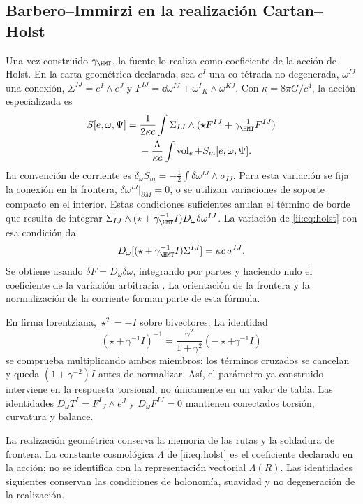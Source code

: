 \subsection{Barbero--Immirzi en la realización Cartan--Holst}
Una vez construido $\gamma_{\HMT}$, la fuente lo realiza como
coeficiente de la acción de Holst. En la carta geométrica declarada,
sea $e^I$ una co-tétrada no degenerada, $\omega^{IJ}$ una conexión,
$\Sigma^{IJ}=e^I\wedge e^J$ y
$F^{IJ}=\dd\omega^{IJ}+\omega^I{}_K\wedge\omega^{KJ}$.
Con $\kappa=8\pi G/c^4$, la acción especializada es
\begin{equation}
\begin{aligned}
S[e,\omega,\Psi]
={}&\frac1{2\kappa c}\int
\Sigma_{IJ}\wedge(\star F^{IJ}+\gamma_{\HMT}^{-1}F^{IJ})\\
&-\frac{\Lambda}{\kappa c}\int\operatorname{vol}_e
+S_m[e,\omega,\Psi].
\end{aligned}
\label{ii:eq:holst}
\end{equation}
La convención de corriente es
$\delta_\omega S_m=-\tfrac12\int\delta\omega^{IJ}\wedge\sigma_{IJ}$.
Para esta variación se fija la conexión en la frontera,
$\delta\omega^{IJ}|_{\partial M}=0$, o se utilizan variaciones de
soporte compacto en el interior. Estas condiciones suficientes anulan
el término de borde que resulta de integrar
$\Sigma_{IJ}\wedge(\star+\gamma_{\HMT}^{-1}I)
D_\omega\delta\omega^{IJ}$.
La variación de \eqref{ii:eq:holst} con esa condición da
\[
D_\omega[(\star+\gamma_{\HMT}^{-1}I)\Sigma^{IJ}]
=\kappa c\,\sigma^{IJ}.
\]
Se obtiene usando $\delta F=D_\omega\delta\omega$, integrando por partes
y haciendo nulo el coeficiente de la variación arbitraria
\cite{ii:holst1996}. La orientación de la frontera y la normalización
de la corriente forman parte de esta fórmula.

En firma lorentziana, $\star^2=-I$ sobre bivectores. La identidad
\[
(\star+\gamma^{-1}I)^{-1}
=\frac{\gamma^2}{1+\gamma^2}(-\star+\gamma^{-1}I)
\]
se comprueba multiplicando ambos miembros: los términos cruzados se
cancelan y queda $(1+\gamma^{-2})I$ antes de normalizar.
Así, el parámetro ya construido interviene en la respuesta torsional,
no únicamente en un valor de tabla.
Las identidades
$D_\omega T^I=F^I{}_J\wedge e^J$ y $D_\omega F^{IJ}=0$
mantienen conectados torsión, curvatura y balance.

La realización geométrica conserva la memoria de las rutas y la
soldadura de frontera. La constante cosmológica \(\Lambda\) de
\eqref{ii:eq:holst} es el coeficiente declarado en la acción; no se
identifica con la representación vectorial \(\Lambda(R)\).
Las identidades siguientes conservan las condiciones de holonomía,
suavidad y no degeneración de la realización.


